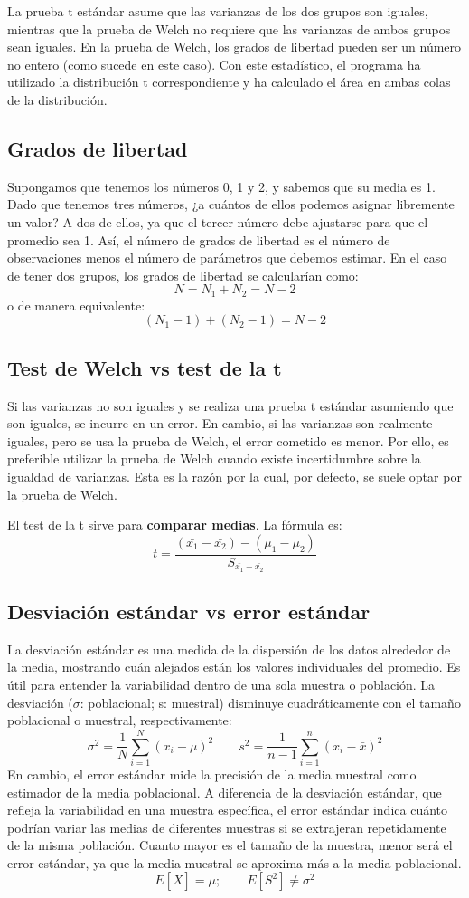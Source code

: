 \documentclass{config/apuntes}\usepackage[]{graphicx}\usepackage[]{xcolor}
\begin{document}
La prueba t estándar asume que las varianzas de los dos grupos son iguales, mientras que la prueba de Welch no requiere que las varianzas de ambos grupos sean iguales. En la prueba de Welch, los grados de libertad pueden ser un número no entero (como sucede en este caso). Con este estadístico, el programa ha utilizado la distribución t correspondiente y ha calculado el área en ambas colas de la distribución.

\subsection{Grados de libertad}
Supongamos que tenemos los números 0, 1 y 2, y sabemos que su media es 1. Dado que tenemos tres números, ¿a cuántos de ellos podemos asignar libremente un valor? A dos de ellos, ya que el tercer número debe ajustarse para que el promedio sea 1. Así, el número de grados de libertad es el número de observaciones menos el número de parámetros que debemos estimar. En el caso de tener dos grupos, los grados de libertad se calcularían como:
$$ N = N_1 + N_2 = N - 2$$
o de manera equivalente:
$$(N_1 - 1) + (N_2 - 1) = N - 2$$

\subsection{Test de Welch vs test de la t}
Si las varianzas no son iguales y se realiza una prueba t estándar asumiendo que son iguales, se incurre en un error. En cambio, si las varianzas son realmente iguales, pero se usa la prueba de Welch, el error cometido es menor. Por ello, es preferible utilizar la prueba de Welch cuando existe incertidumbre sobre la igualdad de varianzas. Esta es la razón por la cual, por defecto, se suele optar por la prueba de Welch.


El test de la t sirve para \textbf{comparar medias}. La fórmula es:
\[
t = \frac{(\bar{x_1} - \bar{x_2})-(\mu_1 - \mu_2)}{S_{\bar{x_1}-\bar{x_2}}}
\]

\subsection{Desviación estándar vs error estándar}
La desviación estándar es una medida de la dispersión de los datos alrededor de la media, mostrando cuán alejados están los valores individuales del promedio. Es útil para entender la variabilidad dentro de una sola muestra o población. La desviación ($\sigma$: poblacional; s: muestral) disminuye cuadráticamente con el tamaño poblacional o muestral, respectivamente:
\[
\sigma^2 = \frac{1}{N} \sum_{i=1}^{N} (x_i - \mu)^2 \quad\quad s^2 = \frac{1}{n - 1} \sum_{i=1}^{n} (x_i - \bar{x})^2
\]
En cambio, el error estándar mide la precisión de la media muestral como estimador de la media poblacional. A diferencia de la desviación estándar, que refleja la variabilidad en una muestra específica, el error estándar indica cuánto podrían variar las medias de diferentes muestras si se extrajeran repetidamente de la misma población. Cuanto mayor es el tamaño de la muestra, menor será el error estándar, ya que la media muestral se aproxima más a la media poblacional.
$$ E[\bar{X}] = \mu ; \quad\quad E[S^2] \neq \sigma^2$$
\end{document}
